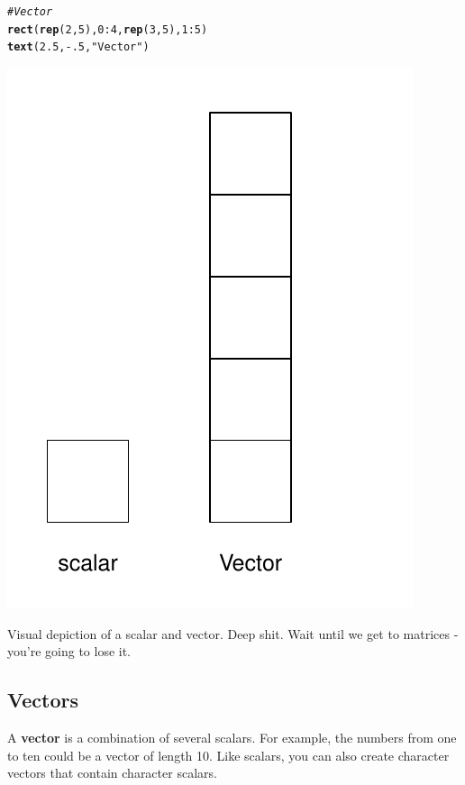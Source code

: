 \documentclass{tufte-book}\usepackage[]{graphicx}\usepackage[]{color}
\makeatletter
\def\maxwidth{ %
  \ifdim\Gin@nat@width>\linewidth
    \linewidth
  \else
    \Gin@nat@width
  \fi
}
\newcommand{\hlnum}[1]{\textcolor[rgb]{0.686,0.059,0.569}{#1}}%
\newcommand{\hlstr}[1]{\textcolor[rgb]{0.192,0.494,0.8}{#1}}%
\newcommand{\hlcom}[1]{\textcolor[rgb]{0.678,0.584,0.686}{\textit{#1}}}%
\newcommand{\hlopt}[1]{\textcolor[rgb]{0,0,0}{#1}}%
\newcommand{\hlstd}[1]{\textcolor[rgb]{0.345,0.345,0.345}{#1}}%
\newcommand{\hlkwd}[1]{\textcolor[rgb]{0.737,0.353,0.396}{\textbf{#1}}}%
\newenvironment{kframe}{%
 \def\at@end@of@kframe{}%
 \ifinner\ifhmode%
  \def\at@end@of@kframe{\end{minipage}}%
  \begin{minipage}{\columnwidth}%
 \fi\fi%
 \def\FrameCommand##1{\hskip\@totalleftmargin \hskip-\fboxsep
 \colorbox{shadecolor}{##1}\hskip-\fboxsep
     \hskip-\linewidth \hskip-\@totalleftmargin \hskip\columnwidth}%
 \MakeFramed {\advance\hsize-\width
   \@totalleftmargin\z@ \linewidth\hsize
   \@setminipage}}%
 {\par\unskip\endMakeFramed%
 \at@end@of@kframe}
\newenvironment{knitrout}{}{} %
\makeatother
\begin{document}
\begin{marginfigure}
\begin{tiny}
\begin{knitrout}
\begin{kframe}
\begin{alltt}
\hlcom{# Vector}
\hlkwd{rect}\hlstd{(}\hlkwd{rep}\hlstd{(}\hlnum{2}\hlstd{,} \hlnum{5}\hlstd{),} \hlnum{0}\hlopt{:}\hlnum{4}\hlstd{,} \hlkwd{rep}\hlstd{(}\hlnum{3}\hlstd{,} \hlnum{5}\hlstd{),} \hlnum{1}\hlopt{:}\hlnum{5}\hlstd{)}
\hlkwd{text}\hlstd{(}\hlnum{2.5}\hlstd{,} \hlopt{-}\hlnum{.5}\hlstd{,} \hlstr{"Vector"}\hlstd{)}
\end{alltt}
\end{kframe}
\includegraphics[width=\maxwidth]{figure/unnamed-chunk-25-1} 

\end{knitrout}
\caption{Visual depiction of a scalar and vector. Deep shit. Wait until we get to matrices - you're going to lose it.}
\label{fig:scalarvector}
\end{tiny}
\end{marginfigure}


\subsection{Vectors}

A \textbf{vector} is a combination of several scalars. For example, the numbers from one to ten could be a vector of length 10. Like scalars, you can also create character vectors that contain character scalars.
\end{document}
